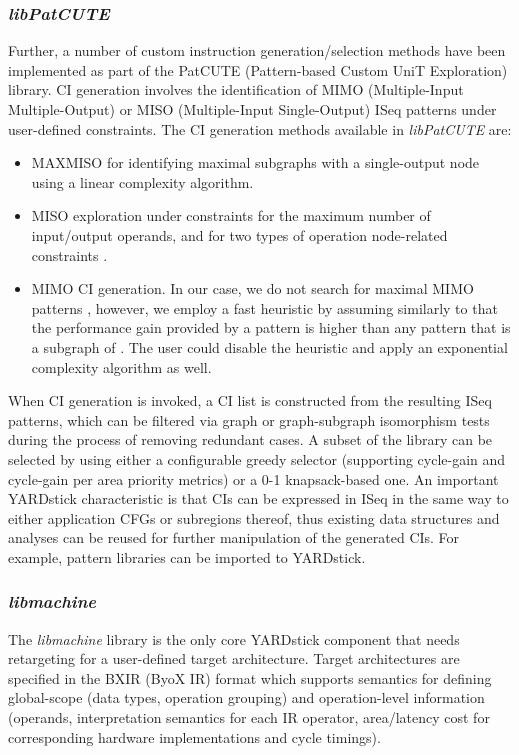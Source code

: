 \documentclass{comjnl}
\begin{document}
\subsubsection{{\it libPatCUTE}}
\label{Sec:libpatcute}
Further, a number of custom instruction generation/selection methods have been implemented as part of the PatCUTE (Pattern-based Custom UniT Exploration) library. CI generation involves the identification of MIMO (Multiple-Input Multiple-Output) or MISO (Multiple-Input Single-Output) ISeq patterns under user-defined constraints. The CI generation methods available in {\it libPatCUTE} are:
\begin{itemize}
\item {MAXMISO \cite{Alippi99} for identifying maximal subgraphs with a single-output node using a linear complexity algorithm.}
\item {MISO exploration under constraints for the maximum number of input/output operands, and for two types of operation node-related constraints \cite{Kavvadias05}.} 
\item {MIMO CI generation. In our case, we do not search for maximal MIMO patterns \cite{Pothineni07}, however, we employ a fast heuristic by assuming similarly to \cite{Pothineni07} that the performance gain provided by a pattern  is higher than any pattern that is a subgraph of . The user could disable the heuristic and apply an exponential complexity algorithm as well.}
\end{itemize}

When CI generation is invoked, a CI list is constructed from the resulting ISeq patterns, which can be filtered via graph or graph-subgraph isomorphism tests \cite{VFLib2} during the process of removing redundant cases. A subset of the library can be selected by using either a configurable greedy selector (supporting cycle-gain and cycle-gain per area priority metrics) or a 0-1 knapsack-based one. An important YARDstick characteristic is that CIs can be expressed in ISeq in the same way to either application CFGs or subregions thereof, thus existing data structures and analyses can be reused for further manipulation of the generated CIs. For example, pattern libraries can be imported to YARDstick.

\subsubsection{{\it libmachine}}
\label{Sec:libmachine}
The {\it libmachine} library is the only core YARDstick component that needs retargeting for a user-defined target architecture. Target architectures are specified in the BXIR (ByoX IR) 
format which supports semantics for defining global-scope (data types, operation grouping) and operation-level information (operands, interpretation semantics for each IR operator, area/latency cost for corresponding hardware implementations and cycle timings). 
\end{document}
